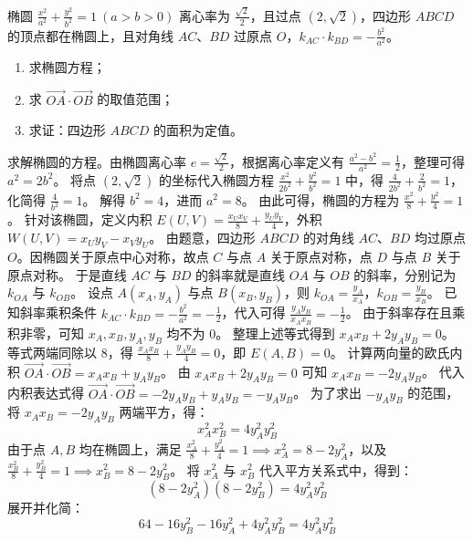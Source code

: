 \begin{example}
椭圆 \(\frac{x^2}{a^2} + \frac{y^2}{b^2} = 1\ (a > b > 0)\) 离心率为 \(\frac{\sqrt{2}}{2}\)，且过点 \((2,\sqrt{2})\)，四边形 \(ABCD\) 的顶点都在椭圆上，且对角线 \(AC\)、\(BD\) 过原点 \(O\)，\(k_{AC} \cdot k_{BD} = -\frac{b^2}{a^2}\)。
\begin{enumerate}
    \item 求椭圆方程；
    \item 求 \(\overrightarrow{OA} \cdot \overrightarrow{OB}\) 的取值范围；
    \item 求证：四边形 \(ABCD\) 的面积为定值。
\end{enumerate}
\end{example}
\begin{solution}
求解椭圆的方程。由椭圆离心率 $e = \frac{\sqrt{2}}{2}$，根据离心率定义有 $\frac{a^2-b^2}{a^2} = \frac{1}{2}$，整理可得 $a^2 = 2b^2$。
将点 $(2,\sqrt{2})$ 的坐标代入椭圆方程 $\frac{x^2}{2b^2} + \frac{y^2}{b^2} = 1$ 中，得 $\frac{4}{2b^2} + \frac{2}{b^2} = 1$，化简得 $\frac{4}{b^2} = 1$。
解得 $b^2 = 4$，进而 $a^2 = 8$。
由此可得，椭圆的方程为 $\frac{x^2}{8} + \frac{y^2}{4} = 1$。
针对该椭圆，定义内积 $E(U, V) = \frac{x_U x_V}{8} + \frac{y_U y_V}{4}$，外积 $W(U, V) = x_U y_V - x_V y_U$。
由题意，四边形 $ABCD$ 的对角线 $AC$、$BD$ 均过原点 $O$。因椭圆关于原点中心对称，故点 $C$ 与点 $A$ 关于原点对称，点 $D$ 与点 $B$ 关于原点对称。
于是直线 $AC$ 与 $BD$ 的斜率就是直线 $OA$ 与 $OB$ 的斜率，分别记为 $k_{OA}$ 与 $k_{OB}$。
设点 $A(x_A, y_A)$ 与点 $B(x_B, y_B)$，则 $k_{OA} = \frac{y_A}{x_A}$，$k_{OB} = \frac{y_B}{x_B}$。
已知斜率乘积条件 $k_{AC} \cdot k_{BD} = -\frac{b^2}{a^2} = -\frac{1}{2}$，代入可得 $\frac{y_A y_B}{x_A x_B} = -\frac{1}{2}$。
由于斜率存在且乘积非零，可知 $x_A, x_B, y_A, y_B$ 均不为 $0$。
整理上述等式得到 $x_A x_B + 2y_A y_B = 0$。
等式两端同除以 $8$，得 $\frac{x_A x_B}{8} + \frac{y_A y_B}{4} = 0$，即 $E(A, B) = 0$。
计算两向量的欧氏内积 $\overrightarrow{OA} \cdot \overrightarrow{OB} = x_A x_B + y_A y_B$。
由 $x_A x_B + 2y_A y_B = 0$ 可知 $x_A x_B = -2y_A y_B$。
代入内积表达式得 $\overrightarrow{OA} \cdot \overrightarrow{OB} = -2y_A y_B + y_A y_B = -y_A y_B$。
为了求出 $-y_A y_B$ 的范围，将 $x_A x_B = -2y_A y_B$ 两端平方，得：
\[ x_A^2 x_B^2 = 4y_A^2 y_B^2 \]
由于点 $A, B$ 均在椭圆上，满足 $\frac{x_A^2}{8} + \frac{y_A^2}{4} = 1 \implies x_A^2 = 8 - 2y_A^2$，以及 $\frac{x_B^2}{8} + \frac{y_B^2}{4} = 1 \implies x_B^2 = 8 - 2y_B^2$。
将 $x_A^2$ 与 $x_B^2$ 代入平方关系式中，得到：
\[ (8 - 2y_A^2)(8 - 2y_B^2) = 4y_A^2 y_B^2 \]
展开并化简：
\[ 64 - 16y_B^2 - 16y_A^2 + 4y_A^2 y_B^2 = 4y_A^2 y_B^2 \]

\end{solution}
